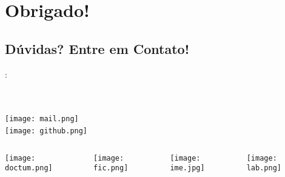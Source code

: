 \section*{Obrigado!}
\label{sec:obrigado}

\subsection*{Dúvidas? Entre em Contato!}
\begin{frame}
	\begin{block}{}
		\begin{center}
			\textbf{\mysubject}: \\[2ex] \mytitle\\[1ex]
		\end{center}
	\end{block}
	
	\vspace{1ex}
	
	\begin{center}
		\myauthor \\[4ex]          	
		 \texttt{[image: mail.png]}\textcolor{white}{-} \myauthoremail \\
		 \texttt{[image: github.png]}\textcolor{white}{-}\myauthorgit \\[4ex]
	\end{center}	
	
	\begin{columns}[T]
		\begin{column}[T]{2cm}		
			\texttt{[image: doctum.png]}\centering
		\end{column}
		
		\begin{column}[T]{2cm}		
			\texttt{[image: fic.png]}\centering
		\end{column}
		
		\begin{column}[T]{2cm}		
			\texttt{[image: ime.jpg]}\centering
		\end{column}
		
		\begin{column}[T]{2cm}	
			\texttt{[image: lab.png]}\centering	
		\end{column}
	\end{columns}
	
	\vspace{3ex}
\end{frame}